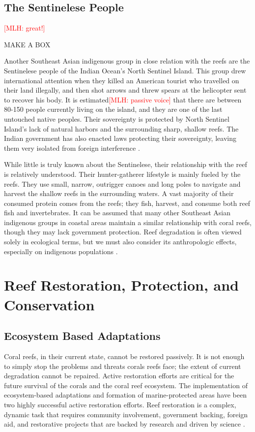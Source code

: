 \documentclass{book}\usepackage{knitr}
\newcommand{\red}[1]{\textcolor{red}{[MLH: #1]}}
\begin{document}
{\subsection{The Sentinelese People}\red{great!}

MAKE A BOX

Another Southeast Asian indigenous group in close relation with the reefs are the Sentinelese people of the Indian Ocean’s North Sentinel Island. This group drew international attention when they killed an American tourist who travelled on their land illegally, and then shot arrows and threw spears at the helicopter sent to recover his body. It is estimated\red{passive voice} that there are between 80-150 people currently living on the island, and they are one of the last untouched native peoples. Their sovereignty is protected by North Sentinel Island’s lack of natural harbors and the surrounding sharp, shallow reefs. The Indian government has also enacted laws protecting their sovereignty, leaving them very isolated from foreign interference \citep{Smith}.

While little is truly known about the Sentinelese, their relationship with the reef is relatively understood. Their hunter-gatherer lifestyle is mainly fueled by the reefs. They use small, narrow, outrigger canoes and long poles to navigate and harvest the shallow reefs in the surrounding waters. A vast majority of their consumed protein comes from the reefs; they fish, harvest, and consume both reef fish and invertebrates. It can be assumed that many other Southeast Asian indigenous groups in coastal areas maintain a similar relationship with coral reefs, though they may lack government protection. Reef degradation is often viewed solely in ecological terms, but we must also consider its anthropologic effects, especially on indigenous populations \citep{Smith}.

\section{Reef Restoration, Protection, and Conservation}

\subsection{Ecosystem Based Adaptations}

Coral reefs, in their current state, cannot be restored passively. It is not enough to simply stop the problems and threats corals reefs face; the extent of current degradation cannot be repaired. Active restoration efforts are critical for the future survival of the corals and the coral reef ecosystem. The implementation of ecosystem-based adaptations and formation of marine-protected areas have been two highly successful active restoration efforts. Reef restoration is a complex, dynamic task that requires community involvement, government backing, foreign aid, and restorative projects that are backed by research and driven by science \citep{14551496520201201}. 

}
\end{document}
